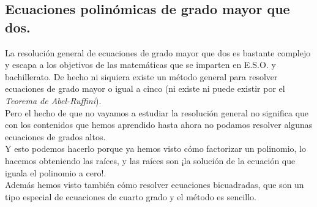 \documentclass[a4paper,11pt,answers]{exam}
\begin{document}
\subsection{Ecuaciones polinómicas de grado mayor que dos.}
La resolución general de ecuaciones de grado mayor que dos es bastante complejo y escapa a los
objetivos de las matemáticas que se imparten en E.S.O. y bachillerato. De hecho ni siquiera existe
un método general para resolver ecuaciones de grado mayor o igual a cinco (ni existe ni puede
existir por el \emph{Teorema de Abel-Ruffini}).\\

Pero el hecho de que no vayamos a estudiar la resolución general no significa que con los
contenidos que hemos aprendido hasta ahora no podamos resolver algunas ecuaciones de grados altos.\\
Y esto podemos hacerlo porque ya hemos visto cómo factorizar un polinomio, lo hacemos obteniendo
las raíces, y las raíces son ¡la solución de la ecuación que iguala el polinomio a cero!.\\
Además hemos visto también cómo resolver ecuaciones bicuadradas, que son un tipo especial de
ecuaciones de cuarto grado y el método es sencillo.
\end{document}
